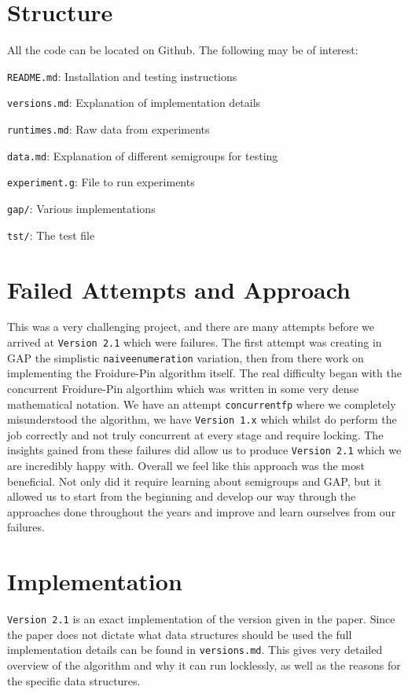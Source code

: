 \documentclass{report}
\begin{document}
\section*{Structure}
All the code can be located on Github\cite{project}. The following may be of interest:
\newline
\begin{description}
\item \texttt{README.md}: Installation and testing instructions
\item \texttt{versions.md}: Explanation of implementation details
\item \texttt{runtimes.md}: Raw data from experiments
\item \texttt{data.md}: Explanation of different semigroups for testing
\item \texttt{experiment.g}: File to run experiments
\item \texttt{gap/}: Various implementations
\item \texttt{tst/}: The test file
\end{description}

\section*{Failed Attempts and Approach}
This was a very challenging project, and there are many attempts before we arrived at \texttt{Version 2.1} which were failures.
The first attempt was creating in GAP the simplistic \texttt{naiveenumeration} variation, then from there work on implementing the
Froidure-Pin algorithm itself.
\newline
The real difficulty began with the concurrent Froidure-Pin algorthim which was written in some very dense mathematical notation.
We have an attempt \texttt{concurrentfp} where we completely misunderstood the algorithm, we have \texttt{Version 1.x} which whilst
do perform the job correctly and not truly concurrent at every stage and require locking.
The insights gained from these failures did allow us to produce \texttt{Version 2.1} which we are incredibly happy with.
\newline
Overall we feel like this approach was the most beneficial. Not only did it require learning about semigroups and GAP, but it allowed us
to start from the beginning and develop our way through the approaches done throughout the years and improve and learn ourselves from our failures.

\section*{Implementation}
\texttt{Version 2.1} is an exact implementation of the version given in the paper. Since the paper does not dictate what data structures should be used
the full implementation details can be found in \texttt{versions.md}. This gives very detailed overview of the algorithm and why it can run locklessly,
as well as the reasons for the specific data structures.
\end{document}
